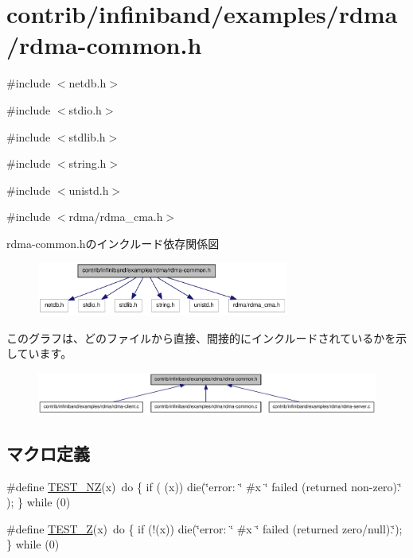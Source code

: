 \hypertarget{rdma-common_8h}{
\section{contrib/infiniband/examples/rdma/rdma-\/common.h}
\label{rdma-common_8h}
}
{\ttfamily \#include $<$netdb.h$>$}\par
{\ttfamily \#include $<$stdio.h$>$}\par
{\ttfamily \#include $<$stdlib.h$>$}\par
{\ttfamily \#include $<$string.h$>$}\par
{\ttfamily \#include $<$unistd.h$>$}\par
{\ttfamily \#include $<$rdma/rdma\_\-cma.h$>$}\par
rdma-\/common.hのインクルード依存関係図\nopagebreak
\begin{figure}[H]
\begin{center}
\leavevmode
\includegraphics[width=235pt]{rdma-common_8h__incl}
\end{center}
\end{figure}
このグラフは、どのファイルから直接、間接的にインクルードされているかを示しています。\nopagebreak
\begin{figure}[H]
\begin{center}
\leavevmode
\includegraphics[width=386pt]{rdma-common_8h__dep__incl}
\end{center}
\end{figure}
\subsection*{マクロ定義}
\begin{DoxyCompactItemize}
\item 
\#define \hyperlink{rdma-common_8h_a6f9c312997bf9d056f521b73c4d74b75}{TEST\_\-NZ}(x)~do \{ if ( (x)) die(\char`\"{}error: \char`\"{} \#x \char`\"{} failed (returned non-\/zero).\char`\"{} ); \} while (0)
\item 
\#define \hyperlink{rdma-common_8h_aaddb23fe07ec45e6fdcc24f53c8196df}{TEST\_\-Z}(x)~do \{ if (!(x)) die(\char`\"{}error: \char`\"{} \#x \char`\"{} failed (returned zero/null).\char`\"{}); \} while (0)
\end{DoxyCompactItemize}
